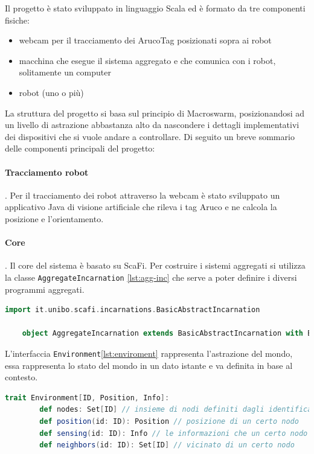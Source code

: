 \documentclass[12pt,a4paper,openright,twoside]{book}
\begin{document}
Il progetto è stato sviluppato in linguaggio Scala ed è formato da tre componenti fisiche:
\begin{itemize}
    \item webcam per il tracciamento dei ArucoTag posizionati sopra ai robot
    \item macchina che esegue il sistema aggregato e che comunica con i robot, solitamente un computer
    \item robot (uno o più)
\end{itemize}

La struttura del progetto si basa sul principio di Macroswarm, posizionandosi ad un livello di astrazione abbastanza alto da nascondere i dettagli implementativi dei dispositivi che si vuole andare a controllare. Di seguito un breve sommario delle componenti principali del progetto:

\paragraph{Tracciamento robot}.
Per il tracciamento dei robot attraverso la webcam è stato sviluppato un applicativo Java di visione artificiale che rileva i tag Aruco e ne calcola la posizione e l'orientamento.

\paragraph{Core}. 
Il core del sistema è basato su ScaFi.
Per costruire i sistemi aggregati si utilizza la classe \verb|AggregateIncarnation| \cref{lst:agg-inc} che serve a poter definire i diversi programmi aggregati.

\begin{lstlisting}[language=Scala, label={lst:agg-inc}, caption={Classe AggregateIncarnation}]
    import it.unibo.scafi.incarnations.BasicAbstractIncarnation

    object AggregateIncarnation extends BasicAbstractIncarnation with BuildingBlocks
\end{lstlisting}

L'interfaccia \verb|Environment|\cref{lst:enviroment} rappresenta l'astrazione del mondo, essa rappresenta lo stato del mondo in un dato istante e va definita in base al contesto.

\begin{lstlisting}[language=Scala, label={lst:enviroment}, caption={Interfaccia Enviroment}]
    trait Environment[ID, Position, Info]:
        def nodes: Set[ID] // insieme di nodi definiti dagli identificatori ID
        def position(id: ID): Position // posizione di un certo nodo
        def sensing(id: ID): Info // le informazioni che un certo nodo espone
        def neighbors(id: ID): Set[ID] // vicinato di un certo nodo
\end{lstlisting}
\end{document}
